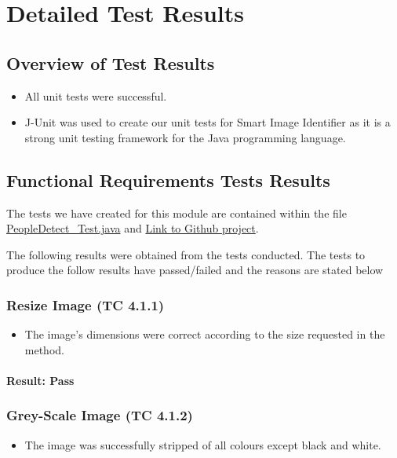 \documentclass[a4paper,12pt]{report}
\begin{document}
	\section{Detailed Test Results}
	\label{sec:Results}
	\subsection{Overview of Test Results}
	\begin {itemize}
	\item All unit tests were successful.
	\item J-Unit was used to create our unit tests for Smart Image Identifier as it is a strong unit testing framework for the Java programming language.
	\end {itemize}

	\subsection{Functional Requirements Tests Results}
		The tests we have created for this module are contained within the file \href{https://github.com/StephenSwanepoel/Ambitious-Designs/blob/master/Smart\%20Image\%20Identifier/src/test/com/codeferm/opencv/PeopleDetect\_Test.java}{PeopleDetect\_Test.java} and \href{https://github.com/StephenSwanepoel/Ambitious-Designs}{Link to Github project}.


		The following results were obtained from the tests conducted. The tests to produce the follow results have passed/failed and the reasons are stated below
		
		\subsubsection{Resize Image (TC 4.1.1)}	
			\begin {itemize}
				\item The image's dimensions were correct according to the size requested in the method.
			\end {itemize}
		\paragraph{Result: Pass}
		
		\subsubsection{Grey-Scale Image (TC 4.1.2)}
		\begin {itemize}
			\item The image was successfully stripped of all colours except black and white.
		\end {itemize}
\end{document}
